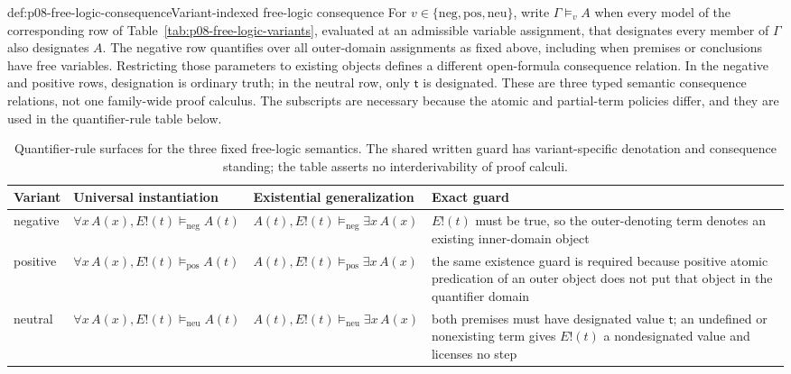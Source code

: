\begin{hbdefinition}{def:p08-free-logic-consequence}{Variant-indexed free-logic consequence}
For \(v\in\{\mathrm{neg},\mathrm{pos},\mathrm{neu}\}\), write
\(\Gamma\models_v A\) when every model of the corresponding row of
Table~\ref{tab:p08-free-logic-variants}, evaluated at an admissible variable
assignment, that designates every member of \(\Gamma\) also designates
\(A\). The negative row quantifies over all outer-domain assignments as
fixed above, including when premises or conclusions have free variables.
Restricting those parameters to existing objects defines a different
open-formula consequence relation. In the negative and positive rows,
designation is ordinary truth; in the neutral row, only
\(\mathsf t\) is designated.  These are three typed semantic consequence
relations, not one family-wide proof calculus.  The subscripts are necessary
because the atomic and partial-term policies differ, and they are used in the
quantifier-rule table below.
\end{hbdefinition}

\begin{table}[htbp]
\centering\small
\begin{tabularx}{\textwidth}{@{}l X X X@{}}
\toprule
Variant & Universal instantiation & Existential generalization & Exact guard \\
\midrule
negative &
\(\forall x\,A(x),E!(t)\models_{\mathrm{neg}}A(t)\) &
\(A(t),E!(t)\models_{\mathrm{neg}}\exists x\,A(x)\) &
\(E!(t)\) must be true, so the outer-denoting term denotes an existing
inner-domain object \\
positive &
\(\forall x\,A(x),E!(t)\models_{\mathrm{pos}}A(t)\) &
\(A(t),E!(t)\models_{\mathrm{pos}}\exists x\,A(x)\) &
the same existence guard is required because positive atomic predication of an
outer object does not put that object in the quantifier domain \\
neutral &
\(\forall x\,A(x),E!(t)\models_{\mathrm{neu}}A(t)\) &
\(A(t),E!(t)\models_{\mathrm{neu}}\exists x\,A(x)\) &
both premises must have designated value \(\mathsf t\); an undefined or
nonexisting term gives \(E!(t)\) a nondesignated value and licenses no step \\
\bottomrule
\end{tabularx}
\caption{Quantifier-rule surfaces for the three fixed free-logic semantics.
The shared written guard has variant-specific denotation and consequence
standing; the table asserts no interderivability of proof calculi.}
\label{tab:p08-free-logic-quantifier-rules}
\end{table}

